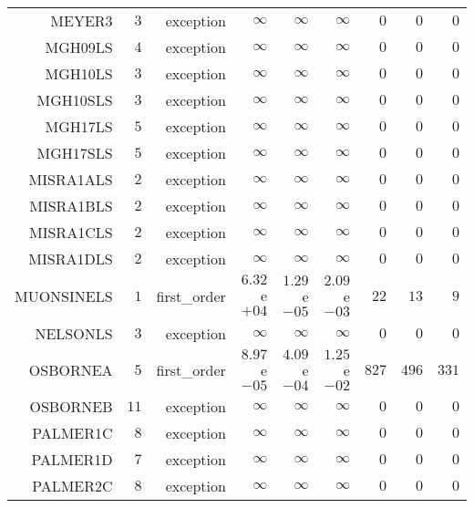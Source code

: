 \begin{longtable}{rrrrrrrrr}
MEYER3 & \(     3\) & exception & \(\infty\) & \(\infty\) & \(\infty\) & \(     0\) & \(     0\) & \(     0\) \\
MGH09LS & \(     4\) & exception & \(\infty\) & \(\infty\) & \(\infty\) & \(     0\) & \(     0\) & \(     0\) \\
MGH10LS & \(     3\) & exception & \(\infty\) & \(\infty\) & \(\infty\) & \(     0\) & \(     0\) & \(     0\) \\
MGH10SLS & \(     3\) & exception & \(\infty\) & \(\infty\) & \(\infty\) & \(     0\) & \(     0\) & \(     0\) \\
MGH17LS & \(     5\) & exception & \(\infty\) & \(\infty\) & \(\infty\) & \(     0\) & \(     0\) & \(     0\) \\
MGH17SLS & \(     5\) & exception & \(\infty\) & \(\infty\) & \(\infty\) & \(     0\) & \(     0\) & \(     0\) \\
MISRA1ALS & \(     2\) & exception & \(\infty\) & \(\infty\) & \(\infty\) & \(     0\) & \(     0\) & \(     0\) \\
MISRA1BLS & \(     2\) & exception & \(\infty\) & \(\infty\) & \(\infty\) & \(     0\) & \(     0\) & \(     0\) \\
MISRA1CLS & \(     2\) & exception & \(\infty\) & \(\infty\) & \(\infty\) & \(     0\) & \(     0\) & \(     0\) \\
MISRA1DLS & \(     2\) & exception & \(\infty\) & \(\infty\) & \(\infty\) & \(     0\) & \(     0\) & \(     0\) \\
MUONSINELS & \(     1\) & first\_order & \( 6.32\)e\(+04\) & \( 1.29\)e\(-05\) & \( 2.09\)e\(-03\) & \(    22\) & \(    13\) & \(     9\) \\
NELSONLS & \(     3\) & exception & \(\infty\) & \(\infty\) & \(\infty\) & \(     0\) & \(     0\) & \(     0\) \\
OSBORNEA & \(     5\) & first\_order & \( 8.97\)e\(-05\) & \( 4.09\)e\(-04\) & \( 1.25\)e\(-02\) & \(   827\) & \(   496\) & \(   331\) \\
OSBORNEB & \(    11\) & exception & \(\infty\) & \(\infty\) & \(\infty\) & \(     0\) & \(     0\) & \(     0\) \\
PALMER1C & \(     8\) & exception & \(\infty\) & \(\infty\) & \(\infty\) & \(     0\) & \(     0\) & \(     0\) \\
PALMER1D & \(     7\) & exception & \(\infty\) & \(\infty\) & \(\infty\) & \(     0\) & \(     0\) & \(     0\) \\
PALMER2C & \(     8\) & exception & \(\infty\) & \(\infty\) & \(\infty\) & \(     0\) & \(     0\) & \(     0\) \\

\end{longtable}
